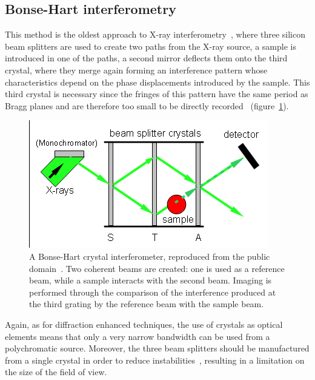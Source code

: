 \subsection{Bonse-Hart interferometry}
This method is the oldest approach to X-ray
interferometry~\parencite{1965ApPhL...7...99B,1965ApPhL...6..155B}, where three
silicon beam splitters are used to create two paths from the X-ray source, a
sample is introduced in one of the paths, a second mirror deflects them onto
the third crystal, where they merge again forming an interference pattern
whose characteristics depend on the phase displacements introduced by the
sample. This third crystal is necessary since the fringes of this pattern
have the same period as Bragg planes and are therefore too small to be
directly recorded~\parencite{1974ApOpt..13.2693B} (figure~\ref{fig:bonse-hart}).

\begin{figure}[htb]
    \centering
    \includegraphics[width=.7\textwidth]{gfx/Crystal_interferometer.png}
    \caption[Bonse-Hart interferometer.]{A Bonse-Hart crystal
        interferometer, reproduced from the public domain~\parencite{bonse-hart-picture}. Two coherent beams are created: one is used as a
reference beam, while a sample interacts with the second beam. Imaging is
performed through the
comparison of the interference produced at the third grating by the
reference beam with the sample beam.}
    \label{fig:bonse-hart}
\end{figure}

Again, as for diffraction enhanced techniques, the use of crystals as
optical elements means that only a very narrow bandwidth can be used from a
polychromatic source. Moreover, the three beam splitters should be
manufactured from a single crystal in order to reduce
instabilities~\parencite{1965ApPhL...7...99B},
resulting in a limitation on the size of the field of view.

